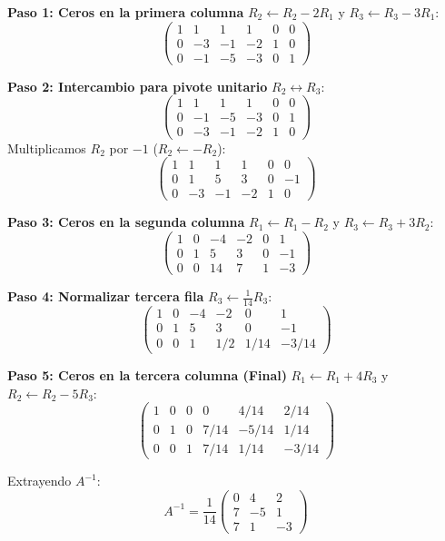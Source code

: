 \documentclass{article}
\begin{document}
	\textbf{Paso 1: Ceros en la primera columna}
	$R_2 \leftarrow R_2 - 2R_1$ y $R_3 \leftarrow R_3 - 3R_1$:
	\[
	\left( \begin{array}{ccc|ccc} 1 & 1 & 1 & 1 & 0 & 0 \\ 0 & -3 & -1 & -2 & 1 & 0 \\ 0 & -1 & -5 & -3 & 0 & 1 \end{array} \right)
	\]
	
	\textbf{Paso 2: Intercambio para pivote unitario}
	$R_2 \leftrightarrow R_3$:
	\[
	\left( \begin{array}{ccc|ccc} 1 & 1 & 1 & 1 & 0 & 0 \\ 0 & -1 & -5 & -3 & 0 & 1 \\ 0 & -3 & -1 & -2 & 1 & 0 \end{array} \right)
	\]
	Multiplicamos $R_2$ por $-1$ ($R_2 \leftarrow -R_2$):
	\[
	\left( \begin{array}{ccc|ccc} 1 & 1 & 1 & 1 & 0 & 0 \\ 0 & 1 & 5 & 3 & 0 & -1 \\ 0 & -3 & -1 & -2 & 1 & 0 \end{array} \right)
	\]
	
	\textbf{Paso 3: Ceros en la segunda columna}
	$R_1 \leftarrow R_1 - R_2$ y $R_3 \leftarrow R_3 + 3R_2$:
	\[
	\left( \begin{array}{ccc|ccc} 1 & 0 & -4 & -2 & 0 & 1 \\ 0 & 1 & 5 & 3 & 0 & -1 \\ 0 & 0 & 14 & 7 & 1 & -3 \end{array} \right)
	\]
	
	\textbf{Paso 4: Normalizar tercera fila}
	$R_3 \leftarrow \frac{1}{14}R_3$:
	\[
	\left( \begin{array}{ccc|ccc} 1 & 0 & -4 & -2 & 0 & 1 \\ 0 & 1 & 5 & 3 & 0 & -1 \\ 0 & 0 & 1 & 1/2 & 1/14 & -3/14 \end{array} \right)
	\]
	
	\textbf{Paso 5: Ceros en la tercera columna (Final)}
	$R_1 \leftarrow R_1 + 4R_3$ y $R_2 \leftarrow R_2 - 5R_3$:
	\[
	\left( \begin{array}{ccc|ccc} 1 & 0 & 0 & 0 & 4/14 & 2/14 \\ 0 & 1 & 0 & 7/14 & -5/14 & 1/14 \\ 0 & 0 & 1 & 7/14 & 1/14 & -3/14 \end{array} \right)
	\]
	
	Extrayendo $A^{-1}$:
	\[
	A^{-1} = \frac{1}{14} \begin{pmatrix} 0 & 4 & 2 \\ 7 & -5 & 1 \\ 7 & 1 & -3 \end{pmatrix}
	\]
	
\end{document}
